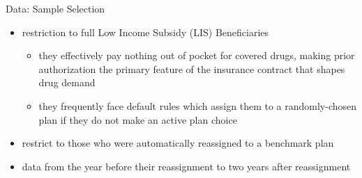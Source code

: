 \begin{frame}{Data: Sample Selection}
    \begin{itemize}
        \item restriction to full Low Income Subsidy (LIS) Beneficiaries
        \begin{itemize}
            \item they effectively pay nothing out of pocket for covered drugs, making prior authorization the primary feature of the insurance contract that shapes drug demand
            \item they frequently face default rules which assign them to a randomly-chosen plan if they do not make an active plan choice
        \end{itemize}
        \item restrict to those who were automatically reassigned to a benchmark plan 
        \item data from the year before their reassignment to two years after reassignment
    \end{itemize}
\end{frame}